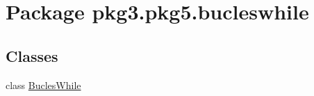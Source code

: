 \hypertarget{namespacepkg3_1_1pkg5_1_1bucleswhile}{}\section{Package pkg3.\+pkg5.\+bucleswhile}
\label{namespacepkg3_1_1pkg5_1_1bucleswhile}
\subsection*{Classes}
\begin{DoxyCompactItemize}
\item 
class \mbox{\hyperlink{classpkg3_1_1pkg5_1_1bucleswhile_1_1_bucles_while}{Bucles\+While}}
\end{DoxyCompactItemize}
